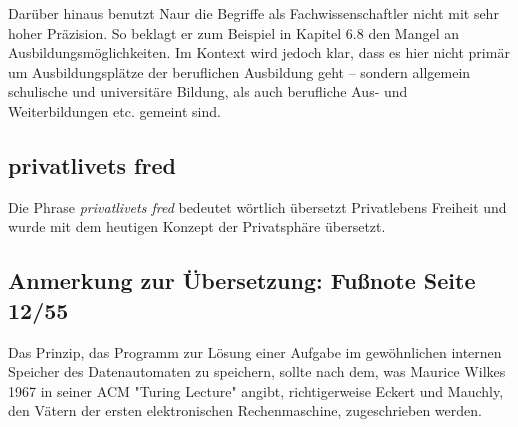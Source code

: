     Darüber hinaus benutzt Naur die Begriffe als Fachwissenschaftler nicht mit sehr hoher Präzision. So beklagt er zum Beispiel in Kapitel 6.8 den Mangel an Ausbildungsmöglichkeiten. Im Kontext wird jedoch klar, dass es hier nicht primär um Ausbildungsplätze der beruflichen Ausbildung geht -- sondern allgemein schulische und universitäre Bildung, als auch berufliche Aus- und Weiterbildungen etc. gemeint sind.

\subsection{privatlivets fred}

    Die Phrase \emph{privatlivets fred} bedeutet wörtlich übersetzt Privatlebens Freiheit und wurde mit dem heutigen Konzept der Privatsphäre übersetzt. 
    
    



    

    
    



\subsection{Anmerkung zur Übersetzung: Fußnote Seite 12/55}
Das Prinzip, das Programm zur Lösung einer Aufgabe im gewöhnlichen internen Speicher des Datenautomaten zu speichern, sollte nach dem, was Maurice Wilkes 1967 in seiner ACM "Turing Lecture" angibt, richtigerweise Eckert und Mauchly, den Vätern der ersten elektronischen Rechenmaschine, zugeschrieben werden.
    

